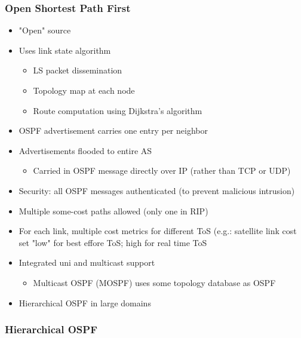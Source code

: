 \documentclass[11pt]{article}
\begin{document}
\subsubsection{Open Shortest Path First}
\label{sec:org91e8913}
\begin{itemize}
\item "Open" source
\item Uses link state algorithm
\begin{itemize}
\item LS packet dissemination
\item Topology map at each node
\item Route computation using Dijkstra's algorithm
\end{itemize}
\item OSPF advertisement carries one entry per neighbor
\item Advertisements flooded to entire AS 
\begin{itemize}
\item Carried in OSPF message directly over IP (rather than TCP or UDP)
\end{itemize}
\item Security: all OSPF messages authenticated (to prevent malicious intrusion)
\item Multiple some-cost paths allowed (only one in RIP)
\item For each link, multiple cost metrics for different ToS (e.g.:
satellite link cost set "low" for best effore ToS; high for real
time ToS
\item Integrated uni and multicast support 
\begin{itemize}
\item Multicast OSPF (MOSPF) uses some topology database as OSPF
\end{itemize}
\item Hierarchical OSPF in large domains
\end{itemize}


\subsubsection{Hierarchical OSPF}
\label{sec:orgd8a8ffa}
\end{document}

